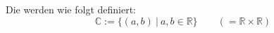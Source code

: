 Die  werden wie folgt definiert:
$$\mathbb{C} := \{(a, b) \ | \ a, b \in \mathbb{R}\} \qquad (= \mathbb{R} \times \mathbb{R})$$